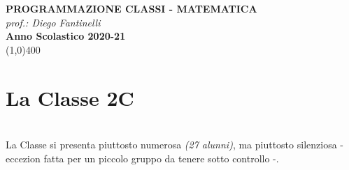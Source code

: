 \documentclass[10pt, a4paper twoside, notitlepage, notoc, justified]{tufte-handout}
\begin{document}
\noindent
{\LARGE{\textbf{PROGRAMMAZIONE CLASSI - MATEMATICA}}}\\[3mm]
{\textit {\small {\em prof.:} Diego Fantinelli}}\\[4mm]
{\textbf{Anno Scolastico 2020-21}}\\
\line(1,0){400}\\
\begin{abstract}
	\lipsum[2]
\end{abstract}

\tableofcontents
%



\setcounter{page}{1}

\newenvironment{loggentry}[2]%
{\noindent\textbf{#2}\marginnote{#1}\\}{\vspace{0.5cm}}

\newpage
\section{La Classe 2C}

\\ 
La Classe si presenta piuttosto numerosa {\em (27 alunni)}, ma piuttosto silenziosa - eccezion fatta per un piccolo gruppo da tenere sotto controllo -.\\ 
\end{document}
